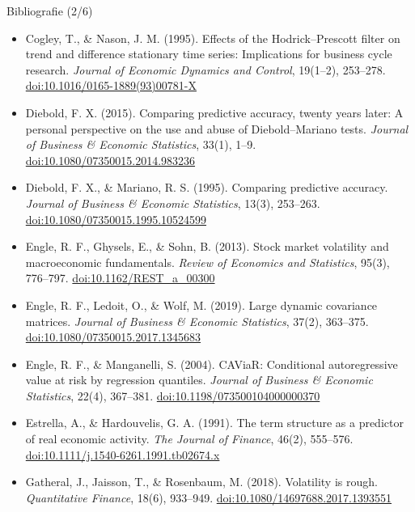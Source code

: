 \begin{frame}{Bibliografie (2/6)}
\itemsize{\tiny}
\begin{itemize}
    \item Cogley, T., \& Nason, J. M. (1995). Effects of the Hodrick--Prescott filter on trend and difference stationary time series: Implications for business cycle research. \textit{Journal of Economic Dynamics and Control}, 19(1--2), 253--278. \href{https://doi.org/10.1016/0165-1889(93)00781-X}{doi:10.1016/0165-1889(93)00781-X}
    \item Diebold, F. X. (2015). Comparing predictive accuracy, twenty years later: A personal perspective on the use and abuse of Diebold--Mariano tests. \textit{Journal of Business \& Economic Statistics}, 33(1), 1--9. \href{https://doi.org/10.1080/07350015.2014.983236}{doi:10.1080/07350015.2014.983236}
    \item Diebold, F. X., \& Mariano, R. S. (1995). Comparing predictive accuracy. \textit{Journal of Business \& Economic Statistics}, 13(3), 253--263. \href{https://doi.org/10.1080/07350015.1995.10524599}{doi:10.1080/07350015.1995.10524599}
    \item Engle, R. F., Ghysels, E., \& Sohn, B. (2013). Stock market volatility and macroeconomic fundamentals. \textit{Review of Economics and Statistics}, 95(3), 776--797. \href{https://doi.org/10.1162/REST_a_00300}{doi:10.1162/REST\_a\_00300}
    \item Engle, R. F., Ledoit, O., \& Wolf, M. (2019). Large dynamic covariance matrices. \textit{Journal of Business \& Economic Statistics}, 37(2), 363--375. \href{https://doi.org/10.1080/07350015.2017.1345683}{doi:10.1080/07350015.2017.1345683}
    \item Engle, R. F., \& Manganelli, S. (2004). CAViaR: Conditional autoregressive value at risk by regression quantiles. \textit{Journal of Business \& Economic Statistics}, 22(4), 367--381. \href{https://doi.org/10.1198/073500104000000370}{doi:10.1198/073500104000000370}
    \item Estrella, A., \& Hardouvelis, G. A. (1991). The term structure as a predictor of real economic activity. \textit{The Journal of Finance}, 46(2), 555--576. \href{https://doi.org/10.1111/j.1540-6261.1991.tb02674.x}{doi:10.1111/j.1540-6261.1991.tb02674.x}
    \item Gatheral, J., Jaisson, T., \& Rosenbaum, M. (2018). Volatility is rough. \textit{Quantitative Finance}, 18(6), 933--949. \href{https://doi.org/10.1080/14697688.2017.1393551}{doi:10.1080/14697688.2017.1393551}

\end{itemize}
\end{frame}

